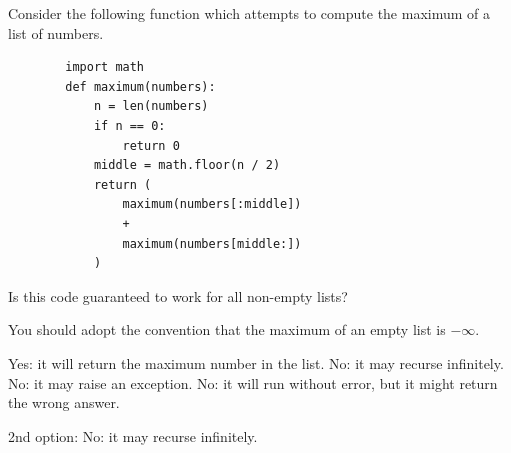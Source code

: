 \begin{prob}

    Consider the following function which attempts to compute the maximum of a list of
    numbers.

    \begin{verbatim}
        import math
        def maximum(numbers):
            n = len(numbers)
            if n == 0:
                return 0
            middle = math.floor(n / 2)
            return (
                maximum(numbers[:middle])
                +
                maximum(numbers[middle:])
            )
    \end{verbatim}

    Is this code guaranteed to work for all non-empty lists?

    You should adopt the convention that the maximum of an empty list is $-\infty$.

    \begin{choices}
        \choice Yes: it will return the maximum number in the list.
        \correctchoice No: it may recurse infinitely.
        \choice No: it may raise an exception.
        \choice No: it will run without error, but it might return the wrong answer.
    \end{choices}

    \begin{soln}
        2nd option: No: it may recurse infinitely.
    \end{soln}
\end{prob}
